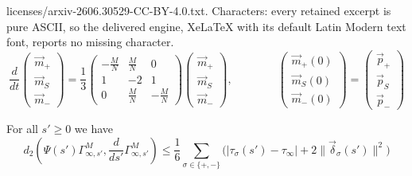 \documentclass[10pt,a4paper]{amsart}
\begin{document}
licenses/arxiv-2606.30529-CC-BY-4.0.txt. Characters: every retained excerpt is pure ASCII, so the delivered engine, XeLaTeX with its default Latin Modern text font, reports no missing character.
\begin{equation}\label{eq:IVPM1}
\frac{d}{dt}\begin{pmatrix}
		\vec m_+ \\ \vec m_S \\ \vec m_-
	\end{pmatrix}=
\frac 13\begin{pmatrix}
-\frac{M}{N} & \frac MN & 0\\
1 & -2 & 1\\
0 & \frac{M}{N} & -\frac MN
\end{pmatrix}
\begin{pmatrix}
		\vec m_+ \\ \vec m_S \\ \vec m_-
	\end{pmatrix},
\qquad\qquad
\begin{pmatrix}
		\vec m_+(0) \\ \vec m_S(0) \\ \vec m_-(0)
	\end{pmatrix}=
\begin{pmatrix}
		\vec p_+ \\ \vec p_S \\ \vec p_-
	\end{pmatrix}
\end{equation}

\begin{Prop}\label{Prop:tedious}
For all $s' \geq 0$ we have 
\begin{equation*} 
d_2\left(\Psi(s') \Gamma^M_{\infty,s'},
\frac{d}{ds'} \Gamma^M_{\infty,s'}\right) \leq \frac 1 6  \sum_{\sigma\in\{+,-\}}\big(|\tau_\sigma(s') - \tau_\infty| + 
2\|\vec\delta_\sigma(s')\|^2\big)
\end{equation*} 
\end{Prop}
\end{document}
